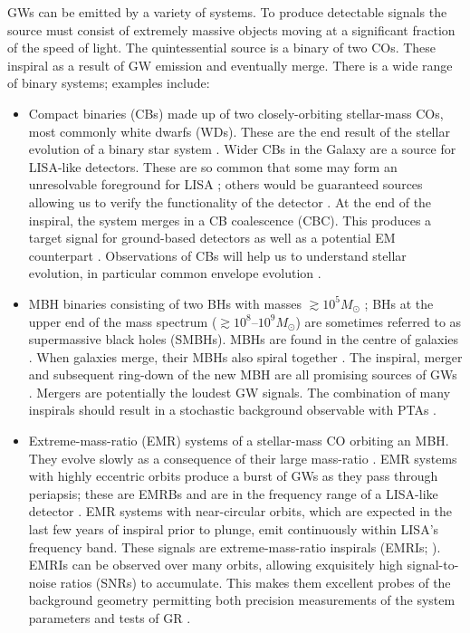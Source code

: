 GWs can be emitted by a variety of systems. To produce detectable signals the source must consist of extremely massive objects moving at a significant fraction of the speed of light. The quintessential source is a binary of two COs. These inspiral as a result of GW emission and eventually merge. There is a wide range of binary systems; examples include:
\begin{itemize}
\item Compact binaries (CBs) made up of two closely-orbiting stellar-mass COs, most commonly white dwarfs (WDs). These are the end result of the stellar evolution of a binary star system \citep{Postnov2006}. Wider CBs in the Galaxy are a source for LISA-like detectors. These are so common that some may form an unresolvable foreground for LISA \citep{Nelemans2009}; others would be guaranteed sources allowing us to verify the functionality of the detector \citep{Stroeer2006}. At the end of the inspiral, the system merges in a CB coalescence (CBC). This produces a target signal for ground-based detectors \citep{Abadie2010a} as well as a potential EM counterpart \citep[e.g.,][]{Webbink1984,Iben1984Jr,Metzger2010,Rezzolla2011,Nakar2011}. Observations of CBs will help us to understand stellar evolution, in particular common envelope evolution \citep{Ivanova2013}.

\item MBH binaries consisting of two BHs with masses $\gtrsim 10^5 M_\odot$ \citep{Sesana2013b}; BHs at the upper end of the mass spectrum ($\gtrsim10^8$--$10^9 M_\odot$) are sometimes referred to as supermassive black holes (SMBHs). MBHs are found in the centre of galaxies \citep{Lynden-Bell1969,Ferrarese2005}. When galaxies merge, their MBHs also spiral together \citep{Volonteri2003,Schnittman2013}. The inspiral, merger and subsequent ring-down of the new MBH are all promising sources of GWs \citep{Flanagan1998}. Mergers are potentially the loudest GW signals. The combination of many inspirals should result in a stochastic background observable with PTAs \citep{Sesana2008}.

\item Extreme-mass-ratio (EMR) systems of a stellar-mass CO orbiting an MBH. They evolve slowly as a consequence of their large mass-ratio \citep{Glampedakis2005,Barack2009}. EMR systems with highly eccentric orbits produce a burst of GWs as they pass through periapsis; these are EMRBs and are in the frequency range of a LISA-like detector \citep{Rubbo2006}. EMR systems with near-circular orbits, which are expected in the last few years of inspiral prior to plunge, emit continuously within LISA's frequency band. These signals are extreme-mass-ratio inspirals (EMRIs; \citealt{Amaro-Seoane2007}). EMRIs can be observed over many orbits, allowing exquisitely high signal-to-noise ratios (SNRs) to accumulate. This makes them excellent probes of the background geometry permitting both precision measurements of the system parameters and tests of GR \citep[e.g.,][]{Babak2010}.
\end{itemize}
